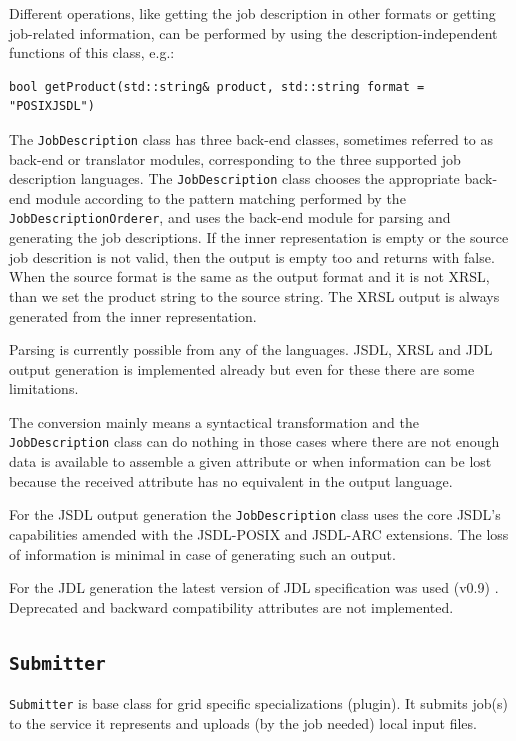 \documentclass{book}
\newcommand{\JobDescription}{\texttt{JobDescription}}
\newcommand{\Submitter}{\texttt{Submitter}}
\begin{document}
Different operations, like getting the job description in other
formats or getting job-related information, can be performed by using the
description-independent functions of this class, e.g.:

\begin{shaded}
\begin{verbatim}
bool getProduct(std::string& product, std::string format = "POSIXJSDL")
\end{verbatim}
\end{shaded}

The {\JobDescription} class has three back-end classes, sometimes
referred to as back-end or translator modules, corresponding to the
three supported job description languages. The {\JobDescription} class
chooses the appropriate back-end module according to the pattern matching
performed by the \texttt{JobDescriptionOrderer}, and uses the back-end
module for parsing and generating the job descriptions.
If the inner representation is empty or the source job descrition is not
valid, then the output is empty too and returns with false.
When the source format is the same as the output format and it is not XRSL,
than we set the product string to the source string. The XRSL output is
always generated from the inner representation. 

Parsing is currently possible from any of the languages. JSDL, XRSL and
JDL output generation is implemented already but even for these there are
some limitations.

The conversion mainly means a syntactical transformation and the
{\JobDescription} class can do nothing in those cases where
there are not enough data is available to assemble a given attribute or
when information can be lost because the received attribute has no
equivalent in the output language.

For the JSDL output generation the {\JobDescription} class uses
the core JSDL's capabilities amended with the JSDL-POSIX and JSDL-ARC
extensions. The loss of information is minimal in case of generating
such an output.

For the JDL generation the latest version of JDL specification was
used (v0.9) \cite{jdl}. Deprecated and backward compatibility
attributes are not implemented.


\subsection{{\Submitter}}

{\Submitter} is base class for grid specific specializations (plugin).
It submits job(s) to the service it represents and uploads (by the job
needed) local input files.
\end{document}

